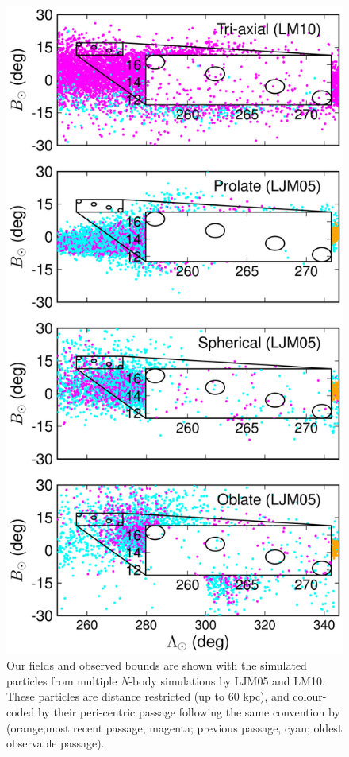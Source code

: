 \documentclass[preprint2]{aastex}
\begin{document}
	\begin{figure}[t!]
		\includegraphics[width=\columnwidth]{./figures/lawspatial.eps}
		\caption{Our fields and observed bounds are shown with the simulated particles from multiple \textit{N}-body simulations by LJM05 and LM10. These particles are distance restricted (up to 60 kpc), and colour-coded by their peri-centric passage following the same convention by \citet{Law;Majewski_2010} (orange;most recent passage, magenta; previous passage, cyan; oldest observable passage).}
		\label{fig:law-spatial}
	\end{figure}
\end{document}
